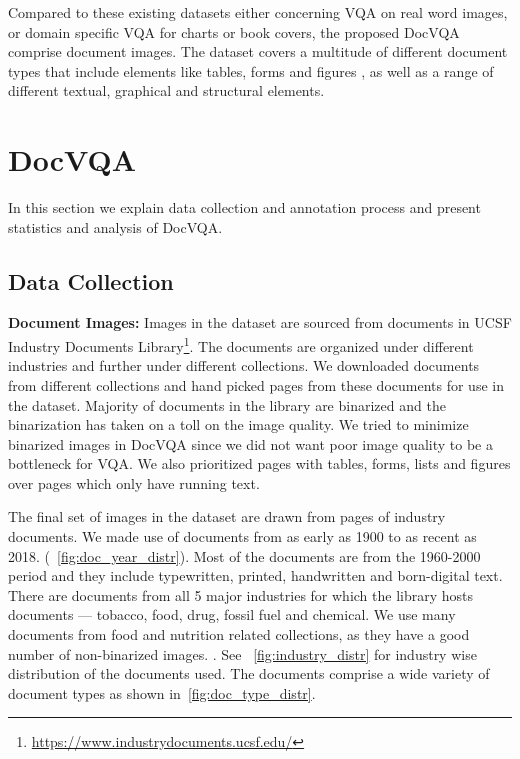 \documentclass[10pt,twocolumn,letterpaper]{article}
\newcommand{\datasetName}{DocVQA\xspace}
\begin{document}
Compared to these existing datasets either concerning VQA on real word images, or domain specific VQA for charts or book covers, the proposed \datasetName comprise document images.
The dataset covers a multitude of different document types that include elements like tables, forms and  figures , as well as a range of different textual, graphical and structural elements.


\section{\datasetName}
In this section we explain data collection and annotation process and present statistics and analysis of \datasetName.

\subsection{Data Collection}
\textbf{Document Images:} Images in the dataset are sourced from documents in UCSF Industry Documents Library\footnote{\url{https://www.industrydocuments.ucsf.edu/}}. The documents are organized under different industries and further under different collections. We downloaded documents from different collections and hand picked pages from these documents for use in the dataset. Majority of  documents in the library are binarized and the binarization has taken on a toll on the image quality. We tried to minimize binarized images in \datasetName since we did not want poor image quality to be a bottleneck for VQA.
We also prioritized pages with tables, forms, lists and figures over pages which only have running text. 

The final set of images in the dataset are drawn from pages of  industry documents. We made use of documents from as early as 1900 to as recent as 2018. (~\autoref{fig:doc_year_distr}). Most of the documents are from the 1960-2000 period and they include typewritten, printed, handwritten and born-digital text. There are documents from all 5 major industries for which the library hosts documents --- tobacco, food, drug, fossil fuel and chemical. 
We use many documents from food and nutrition related collections, as they have a good number of non-binarized images.
. 
See ~\autoref{fig:industry_distr} for industry wise distribution of the  documents used. The documents comprise a wide variety of document types as shown in~\autoref{fig:doc_type_distr}. 
\end{document}
